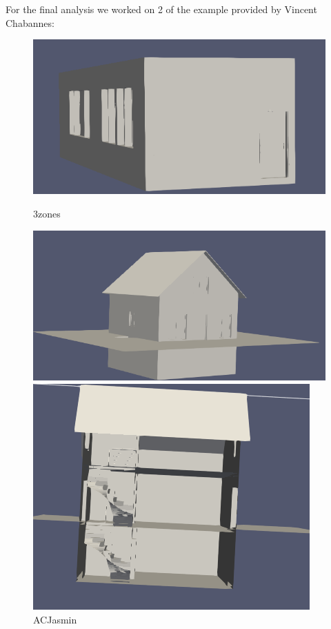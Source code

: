 \documentclass{article}
\begin{document}
For the final analysis we worked on 2 of the example provided by Vincent Chabannes:
\vspace{0.5cm}
\begin{figure}[H]
  \centering
  \begin{minipage}[t]{0.29\textwidth}
    \includegraphics[width=\textwidth]{../../images/screen_kinetic/3zones.png}
    \caption*{3zones}
  \end{minipage}
  \hspace{0.05\textwidth}
  \begin{minipage}[t]{0.27\textwidth}
    \includegraphics[width=\textwidth]{../../images/screen_kinetic/ACJasmin.png}
    \caption*{ACJasmin}
  \end{minipage}
  \hspace{0.05\textwidth}
  \begin{minipage}[t]{0.27\textwidth}
    \includegraphics[width=\textwidth]{../../images/screen_kinetic/ACJasmin_inside.png}

\end{minipage}
\end{figure}
\end{document}
